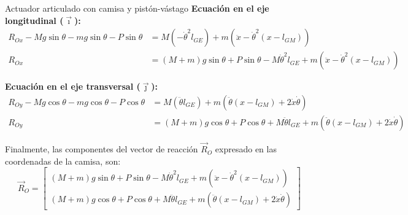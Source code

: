 \begin{solucion}{Actuador articulado con camisa y pistón-vástago}
\textbf{Ecuación en el eje longitudinal ($\vec{\imath}$):}
\begin{align*}
    R_{Ox} - Mg\sin\theta - mg\sin\theta - P\sin\theta &= M(-\dot{\theta}^2 l_{GE}) + m\left(\ddot{x} - \dot{\theta}^2(x - l_{GM})\right) \\
    R_{Ox} &= (M + m)g\sin\theta + P\sin\theta - M\dot{\theta}^2 l_{GE} + m\left(\ddot{x} - \dot{\theta}^2(x - l_{GM})\right)
\end{align*}

\textbf{Ecuación en el eje transversal ($\vec{\jmath}$):}
\begin{align*}
    R_{Oy} - Mg\cos\theta - mg\cos\theta - P\cos\theta &= M(\ddot{\theta} l_{GE}) + m\left(\ddot{\theta}(x - l_{GM}) + 2\dot{x}\dot{\theta}\right) \\
    R_{Oy} &= (M + m)g\cos\theta + P\cos\theta + M\ddot{\theta} l_{GE} + m\left(\ddot{\theta}(x - l_{GM}) + 2\dot{x}\dot{\theta}\right)
\end{align*}

Finalmente, las componentes del vector de reacción $\vec{R}_O$ expresado en las coordenadas de la camisa, son:
\begin{equation}
    \vec{R}_O = \begin{bmatrix}
    (M + m)g\sin\theta + P\sin\theta - M\dot{\theta}^2 l_{GE} + m\left(\ddot{x} - \dot{\theta}^2(x - l_{GM})\right) \\
    (M + m)g\cos\theta + P\cos\theta + M\ddot{\theta} l_{GE} + m\left(\ddot{\theta}(x - l_{GM}) + 2\dot{x}\dot{\theta}\right)
    \end{bmatrix}
\end{equation}
\end{solucion}
